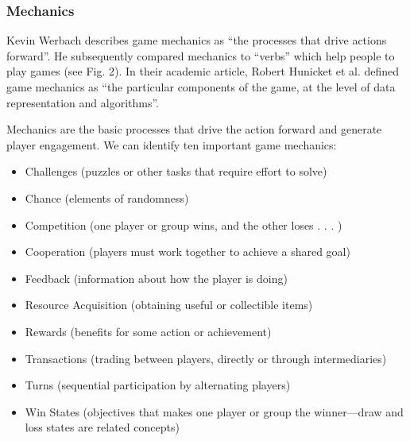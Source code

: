 \subsubsection{Mechanics}
Kevin Werbach describes game mechanics as ``the processes that drive actions forward''. He subsequently compared mechanics to ``verbs'' which help people to play games (see Fig. 2). In their academic article, Robert Hunicket et al. defined game mechanics as “the particular components of the game, at the level of data representation and algorithms”.

Mechanics are the basic processes that drive the action forward and generate player engagement. We
can identify ten important game mechanics:

\begin{itemize}
\item Challenges (puzzles or other tasks that require effort to solve)
\item Chance (elements of randomness)
\item Competition (one player or group wins, and the other loses . . . )
\item Cooperation (players must work together to achieve a shared goal)
\item Feedback (information about how the player is doing)
\item Resource Acquisition (obtaining useful or collectible items)
\item Rewards (benefits for some action or achievement)
\item Transactions (trading between players, directly or through intermediaries)
\item Turns (sequential participation by alternating players)
\item Win States (objectives that makes one player or group the winner—draw and loss states are
related concepts)
\end{itemize}
